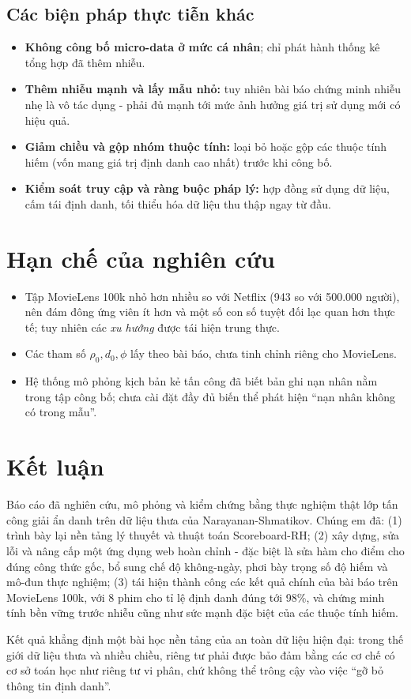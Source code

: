 \subsection{Các biện pháp thực tiễn khác}
\renewcommand{\labelitemi}{$-$}
\begin{itemize}
	\item \textbf{Không công bố micro-data ở mức cá nhân}; chỉ phát hành thống kê tổng hợp đã thêm nhiễu.
	\item \textbf{Thêm nhiễu mạnh và lấy mẫu nhỏ:} tuy nhiên bài báo chứng minh nhiễu nhẹ là vô tác dụng - phải đủ mạnh tới mức ảnh hưởng giá trị sử dụng mới có hiệu quả.
	\item \textbf{Giảm chiều và gộp nhóm thuộc tính:} loại bỏ hoặc gộp các thuộc tính hiếm (vốn mang giá trị định danh cao nhất) trước khi công bố.
	\item \textbf{Kiểm soát truy cập và ràng buộc pháp lý:} hợp đồng sử dụng dữ liệu, cấm tái định danh, tối thiểu hóa dữ liệu thu thập ngay từ đầu.
\end{itemize}

\section{Hạn chế của nghiên cứu}

\renewcommand{\labelitemi}{$-$}
\begin{itemize}
	\item Tập MovieLens 100k nhỏ hơn nhiều so với Netflix (943 so với 500.000 người), nên đám đông ứng viên ít hơn và một số con số tuyệt đối lạc quan hơn thực tế; tuy nhiên các \textit{xu hướng} được tái hiện trung thực.
	\item Các tham số $\rho_0, d_0, \phi$ lấy theo bài báo, chưa tinh chỉnh riêng cho MovieLens.
	\item Hệ thống mô phỏng kịch bản kẻ tấn công đã biết bản ghi nạn nhân nằm trong tập công bố; chưa cài đặt đầy đủ biến thể phát hiện ``nạn nhân không có trong mẫu''.
\end{itemize}

\section{Kết luận}

Báo cáo đã nghiên cứu, mô phỏng và kiểm chứng bằng thực nghiệm thật lớp tấn công giải ẩn danh trên dữ liệu thưa của Narayanan-Shmatikov. Chúng em đã: (1) trình bày lại nền tảng lý thuyết và thuật toán Scoreboard-RH; (2) xây dựng, sửa lỗi và nâng cấp một ứng dụng web hoàn chỉnh - đặc biệt là sửa hàm cho điểm cho đúng công thức gốc, bổ sung chế độ không-ngày, phơi bày trọng số độ hiếm và mô-đun thực nghiệm; (3) tái hiện thành công các kết quả chính của bài báo trên MovieLens 100k, với 8 phim cho tỉ lệ định danh đúng tới 98\%, và chứng minh tính bền vững trước nhiễu cũng như sức mạnh đặc biệt của các thuộc tính hiếm.

Kết quả khẳng định một bài học nền tảng của an toàn dữ liệu hiện đại: trong thế giới dữ liệu thưa và nhiều chiều, riêng tư phải được bảo đảm bằng các cơ chế có cơ sở toán học như riêng tư vi phân, chứ không thể trông cậy vào việc ``gỡ bỏ thông tin định danh''.
